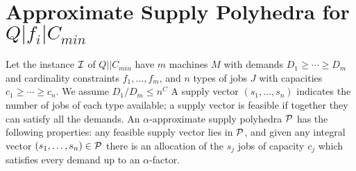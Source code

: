\def\Supp{\mathsf{Supp}\xspace}
\newcommand{\barcalS}{\bar{\cal S}\xspace}
\def\cckp{$Q|k_i|C_{min}$\xspace}
\renewcommand{\brp}{{(p)}}
\renewcommand{\br}[1]{{(#1)}}
\renewcommand{\brp}{{(p)}}
\renewcommand{\br}[1]{{(#1)}}
\renewcommand{\bc}{{\bar c}}
\newcommand{\brt}{{(t)}}
\newcommand{\barD}{\bar{D}}
\newpage
\section{Approximate Supply Polyhedra for $Q|f_i|C_{min}$}
Let the instance ${\cal I}$ of $Q||C_{min}$  have $m$ machines $M$ with demands $D_1 \geq \cdots \geq D_m$ and cardinality constraints $f_1,\ldots,f_m$, and $n$ types of  jobs $J$ with capacities $c_1 \geq \cdots \geq c_n$.  We assume $D_1/D_m \leq n^C$
A supply vector $(s_1,\ldots,s_n)$ indicates the number of jobs of each type available; a supply vector is feasible if together they can satisfy all the demands.
An $\alpha$-approximate supply polyhedra ${\cal P}$ has the following properties: any feasible supply vector lies in ${\cal P}$, and given any integral vector $(s_1,\ldots,s_n) \in {\cal P}$ there is an allocation 
of the $s_j$ jobs of capacity $c_j$ which satisfies every demand up to an $\alpha$-factor.
\smallskip

